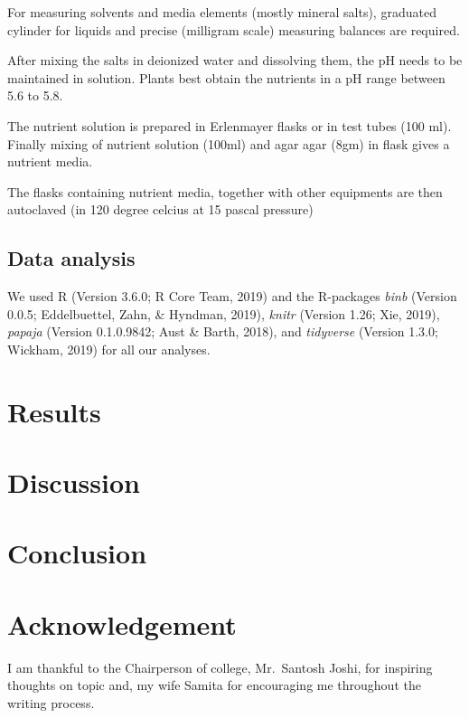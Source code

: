 \documentclass[
  man]{apa6}
\begin{document}
For measuring solvents and media elements (mostly mineral salts), graduated cylinder for liquids and precise (milligram scale) measuring balances are required.

After mixing the salts in deionized water and dissolving them, the pH needs to be maintained in solution. Plants best obtain the nutrients in a pH range between 5.6 to 5.8.

The nutrient solution is prepared in Erlenmayer flasks or in test tubes (100 ml). Finally mixing of nutrient solution (100ml) and agar agar (8gm) in flask gives a nutrient media.

The flasks containing nutrient media, together with other equipments are then autoclaved (in 120 degree celcius at 15 pascal pressure)

\hypertarget{data-analysis}{%
\subsection{Data analysis}\label{data-analysis}}

We used R (Version 3.6.0; R Core Team, 2019) and the R-packages \emph{binb} (Version 0.0.5; Eddelbuettel, Zahn, \& Hyndman, 2019), \emph{knitr} (Version 1.26; Xie, 2019), \emph{papaja} (Version 0.1.0.9842; Aust \& Barth, 2018), and \emph{tidyverse} (Version 1.3.0; Wickham, 2019) for all our analyses.

\hypertarget{results}{%
\section{Results}\label{results}}

\hypertarget{discussion}{%
\section{Discussion}\label{discussion}}

\newpage

\hypertarget{conclusion}{%
\section{Conclusion}\label{conclusion}}

\hypertarget{acknowledgement}{%
\section{Acknowledgement}\label{acknowledgement}}

I am thankful to the Chairperson of college, Mr.~Santosh Joshi, for inspiring thoughts on topic and, my wife Samita for encouraging me throughout the writing process.
\end{document}
